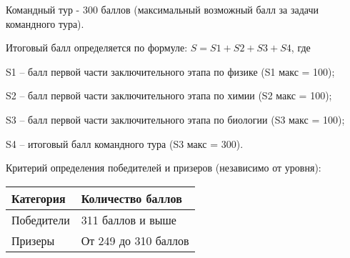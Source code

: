 Командный тур - 300 баллов (максимальный возможный балл за задачи командного тура).

Итоговый балл определяется по формуле: $S = S1 + S2  + S3 + S4$, где

S1 – балл первой части заключительного этапа по физике (S1 макс = 100);

S2 – балл первой части заключительного этапа по химии (S2 макс = 100);

S3 – балл первой части заключительного этапа по биологии (S3 макс = 100);

S4 – итоговый балл командного тура (S3 макс = 300).

Критерий определения победителей и призеров (независимо от уровня):
\begin{center}
    \begin{tabular}{|l|l|}
        \hline
        Категория&Количество баллов\\
        \hline
        Победители&311 баллов и выше\\
        \hline
        Призеры&От 249 до 310 баллов\\
        \hline
    \end{tabular}
\end{center}
